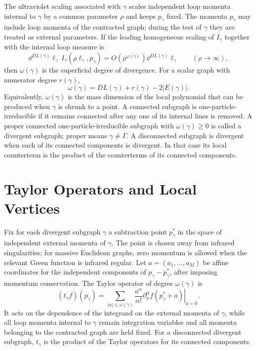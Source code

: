 The ultraviolet scaling associated with \(\gamma\) scales independent loop
momenta internal to \(\gamma\) by a common parameter \(\rho\) and keeps
\(p_\gamma\) fixed.  The momenta \(p_\gamma\) may include loop momenta of the
contracted graph; during the test of \(\gamma\) they are treated as external
parameters.  If the leading homogeneous scaling of \(I_\gamma\) together with
the internal loop measure is
\[
  \dd^{DL(\gamma)}\ell_\gamma\,
  I_\gamma(\rho\ell_\gamma,p_\gamma)
  =
  O(\rho^{\omega(\gamma)})
  \dd^{DL(\gamma)}\ell_\gamma
  \qquad
  (\rho\to\infty),
\]
then \(\omega(\gamma)\) is the superficial degree of divergence.  For a scalar
graph with numerator degree \(r(\gamma)\),
\[
  \omega(\gamma)
  =
  D L(\gamma)+r(\gamma)-2|E(\gamma)|.
\]
Equivalently, \(\omega(\gamma)\) is the mass dimension of the local polynomial
that can be produced when \(\gamma\) is shrunk to a point.  A connected
subgraph is one-particle-irreducible if it remains connected after any one of
its internal lines is removed.  A proper connected one-particle-irreducible
subgraph with \(\omega(\gamma)\ge0\) is called a divergent subgraph; proper
means \(\gamma\ne\Gamma\).  A disconnected subgraph is divergent when each of
its connected components is divergent.  In that case its local counterterm is
the product of the counterterms of its connected components.

\section{Taylor Operators and Local Vertices}

Fix for each divergent subgraph \(\gamma\) a subtraction point
\(p_\gamma^\ast\) in the space of independent external momenta of \(\gamma\).
The point is chosen away from infrared singularities; for massive Euclidean
graphs, zero momentum is allowed when the relevant Green function is infrared
regular.  Let \(a=(a_1,\ldots,a_M)\) be affine coordinates for the independent
components of \(p_\gamma-p_\gamma^\ast\), after imposing momentum
conservation.  The Taylor operator of degree \(\omega(\gamma)\) is
\[
  (t_\gamma f)(p_\gamma)
  =
  \sum_{|\alpha|\le\omega(\gamma)}
  \frac{a^\alpha}{\alpha!}
  \left.
    \partial_a^\alpha f(p_\gamma^\ast+a)
  \right|_{a=0}.
\]
It acts on the dependence of the integrand on the external momenta of
\(\gamma\), while all loop momenta internal to \(\gamma\) remain integration
variables and all momenta belonging to the contracted graph are held fixed.
For a disconnected divergent subgraph, \(t_\gamma\) is the product of the
Taylor operators for its connected components.

